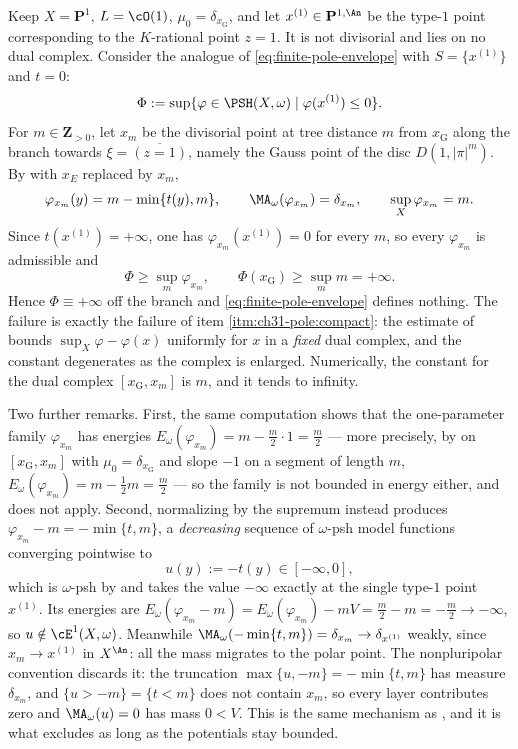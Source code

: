 \begin{example}
\label{ex:ch31-type-one-fails}
Keep \(X=\mathbf P^1\), \(L=\cO(1)\), \(\mu_0=\delta_{x_{\mathrm G}}\), and
let \(x^{(1)}\in\mathbf P^{1,\An}\) be the type-\(1\) point corresponding to
the \(K\)-rational point \(z=1\).  It is not divisorial and lies on no dual
complex.  Consider the analogue of \eqref{eq:finite-pole-envelope} with
\(S=\{x^{(1)}\}\) and \(t=0\):
\[
 \Phi:=\sup\{\varphi\in\PSH(X,\omega)\mid\varphi(x^{(1)})\leq0\} .
\]
For \(m\in\mathbf Z_{>0}\), let \(x_m\) be the divisorial point at tree
distance \(m\) from \(x_{\mathrm G}\) along the branch towards
\(\xi=\overline{(z=1)}\), namely the Gauss point of the disc
\(D(1,|\pi|^m)\).  By  with \(x_E\) replaced by
\(x_m\),
\[
 \varphi_{x_m}(y)=m-\min\{t(y),m\},
 \qquad
 \MA_\omega(\varphi_{x_m})=\delta_{x_m},
 \qquad
 \sup_X\varphi_{x_m}=m .
\]
Since \(t(x^{(1)})=+\infty\), one has \(\varphi_{x_m}(x^{(1)})=0\) for every
\(m\), so every \(\varphi_{x_m}\) is admissible and
\[
 \Phi\geq\sup_m\varphi_{x_m},
 \qquad
 \Phi(x_{\mathrm G})\geq\sup_m m=+\infty .
\]
Hence \(\Phi\equiv+\infty\) off the branch and
\eqref{eq:finite-pole-envelope} defines nothing.  The failure is exactly the
failure of item \cref{itm:ch31-pole:compact}: the estimate of
 bounds \(\sup_X\varphi-\varphi(x)\)
uniformly for \(x\) in a \emph{fixed} dual complex, and the constant
degenerates as the complex is enlarged.  Numerically, the constant for the
dual complex \([x_{\mathrm G},x_m]\) is \(m\), and it tends to infinity.

Two further remarks.  First, the same computation shows that the
one-parameter family \(\varphi_{x_m}\) has energies
\(E_\omega(\varphi_{x_m})=m-\tfrac m2\cdot1=\tfrac m2\) --- more precisely,
by  on \([x_{\mathrm G},x_m]\) with
\(\mu_0=\delta_{x_{\mathrm G}}\) and slope \(-1\) on a segment of length
\(m\), \(E_\omega(\varphi_{x_m})=m-\tfrac12m=\tfrac m2\) --- so the family is
not bounded in energy either, and  does
not apply.  Second, normalizing by the supremum instead produces
\(\varphi_{x_m}-m=-\min\{t,m\}\), a \emph{decreasing} sequence of
\(\omega\)-psh model functions converging pointwise to
\[
 u(y):=-t(y)\in[-\infty,0],
\]
which is \(\omega\)-psh by  and takes
the value \(-\infty\) exactly at the single type-\(1\) point \(x^{(1)}\).
Its energies are
\(E_\omega(\varphi_{x_m}-m)=E_\omega(\varphi_{x_m})-mV=\tfrac m2-m
 =-\tfrac m2\to-\infty\), so \(u\notin\cE^1(X,\omega)\).  Meanwhile
\(\MA_\omega(-\min\{t,m\})=\delta_{x_m}\to\delta_{x^{(1)}}\) weakly, since
\(x_m\to x^{(1)}\) in \(X^{\An}\): all the mass migrates to the polar point.
The nonpluripolar convention  discards it: the
truncation \(\max\{u,-m\}=-\min\{t,m\}\) has measure \(\delta_{x_m}\), and
\(\{u>-m\}=\{t<m\}\) does not contain \(x_m\), so every layer contributes
zero and \(\MA_\omega(u)=0\) has mass \(0<V\).  This is the same mechanism as
, and it is what
 excludes as long as the potentials
stay bounded.
\end{example}

